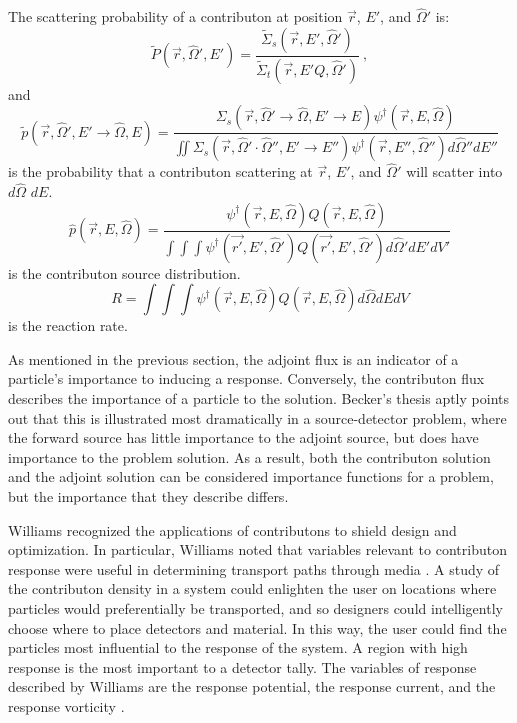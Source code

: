 The scattering probability of a contributon at position $\vec{r}$, $E'$, and
$\hat\Omega'$ is:
\begin{equation}
\widetilde{P}(\vec{r}, \hat\Omega',E') =
         \frac{\widetilde{\Sigma} _{ s }(\vec{r}, E', \hat\Omega')}
       {\widetilde{\Sigma} _{ t }(\vec{r}, E'Q, \hat\Omega')}\:,
\end{equation}
and
\begin{equation}
\widetilde{p}(\vec{r}, \hat\Omega', E'\rightarrow\hat\Omega, E) =
       \frac{\Sigma_{s}(\vec{r}, \hat\Omega'\rightarrow\hat\Omega, E'\rightarrow E)
       \psi^{\dagger} (\vec{r}, E, \hat\Omega)}
       {\iint \Sigma_{s}(\vec{r},\hat\Omega'\cdot\hat\Omega'',E'\rightarrow
       E'')\psi^{\dagger} (\vec{r}, E'', \hat\Omega'')d\hat\Omega'' dE''}
\end{equation}
is the probability that a contributon scattering at $\vec{r}$, $E'$,
and $\hat\Omega'$ will scatter into $d\hat\Omega$ $dE$.
\begin{equation}
\hat p(\vec{r}, E, \hat\Omega) =
\frac{\psi^{\dagger}(\vec{r}, E, \hat\Omega) Q(\vec{r},E,\hat\Omega)}
     {\int \int \int \psi^{\dagger}(\vec{r'},E',\hat\Omega')
     Q(\vec{r'},E',\hat\Omega') d\hat\Omega' dE' dV'}
\end{equation}
is the contributon source distribution.
\begin{equation}
R = \int \int \int \psi^{\dagger}(\vec{r},E,\hat\Omega)Q(\vec{r},E,\hat\Omega)
    d\hat\Omega dE dV
\end{equation}
is the reaction rate.

As mentioned in the previous section, the adjoint flux is an indicator of a
particle's importance to inducing a response. Conversely, the contributon
flux describes the importance of a particle to the solution.
Becker's thesis \cite{becker_hybrid_2009} aptly points out that this is
illustrated most dramatically in a source-detector problem, where the forward
source has little importance to the adjoint source, but does have importance to
the problem solution. As a result, both the contributon solution and the adjoint
solution can be considered importance functions for a problem, but the
importance that they describe differs.

Williams recognized the applications of contributons to
shield design and optimization. In particular, Williams noted that variables
relevant to contributon response were useful in determining transport paths
through media \cite{williams_contributon_study, williams_SCC_shielding}. A study
of the contributon density in a system could enlighten the user on locations
where particles would preferentially be transported, and so designers could
intelligently choose where to place detectors and material. In this way, the
user could find the particles most influential to the response of the system. A
region with high response is the most important to a detector tally. The
variables of response described by Williams are the response potential, the
response current, and the response vorticity \cite{williams_contributorn_1992}.

